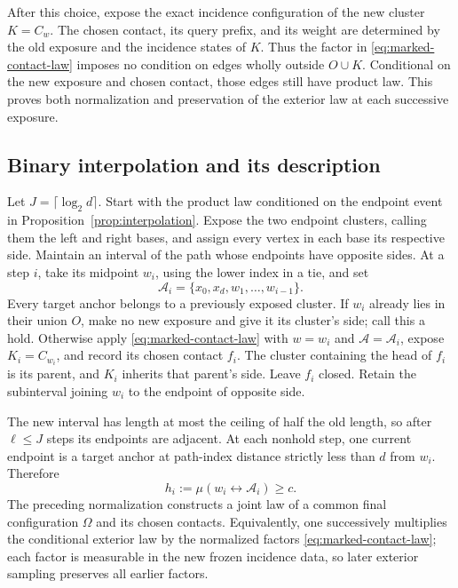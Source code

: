 After this choice, expose the exact incidence configuration of the
new cluster $K=C_w$. The chosen contact, its query prefix, and its
weight are determined by the old exposure and the incidence states of
$K$. Thus the factor in \eqref{eq:marked-contact-law} imposes no
condition on edges wholly outside $O\cup K$. Conditional on the new
exposure and chosen contact, those edges still have product law.
This proves both normalization and preservation of the exterior law
at each successive exposure.

\subsection{Binary interpolation and its description}

Let $J=\lceil\log_2d\rceil$. Start with the product law conditioned
on the endpoint event in Proposition~\ref{prop:interpolation}. Expose
the two endpoint clusters, calling them the left and right bases, and
assign every vertex in each base its respective side.
Maintain an interval of the path whose endpoints have opposite sides.
At a step $i$, take its midpoint $w_i$, using the lower index in a tie,
and set
\[
 \mathcal A_i=\{x_0,x_d,w_1,\ldots,w_{i-1}\}.
\]
Every target anchor belongs to a previously exposed cluster. If $w_i$
already lies in their union $O$, make no new exposure and give it its
cluster's side; call this a hold. Otherwise apply
\eqref{eq:marked-contact-law} with $w=w_i$ and
$\mathcal A=\mathcal A_i$, expose $K_i=C_{w_i}$, and record its
chosen contact $f_i$. The cluster containing the head of $f_i$ is its
parent, and $K_i$ inherits that parent's side. Leave $f_i$ closed.
Retain the subinterval joining $w_i$ to the endpoint of opposite side.

The new interval has length at most the ceiling of half the old length,
so after $\ell\le J$ steps its endpoints are adjacent. At each
nonhold step, one current endpoint is a target anchor at path-index
distance strictly less than $d$ from $w_i$. Therefore
\begin{equation}\label{eq:interpolation-root-bound}
 h_i:=\mu(w_i\leftrightarrow\mathcal A_i)\ge c.
\end{equation}
The preceding normalization constructs a joint law of a common final
configuration $\Omega$ and its chosen contacts. Equivalently, one
successively multiplies the conditional exterior law by the normalized
factors \eqref{eq:marked-contact-law}; each factor is measurable in the
new frozen incidence data, so later exterior sampling preserves all
earlier factors.

